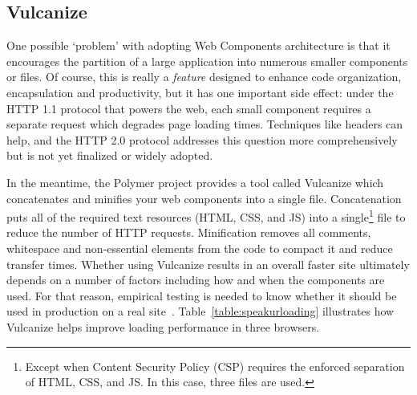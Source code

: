 \subsection{Vulcanize}
One possible `problem' with adopting Web Components architecture is that it encourages the partition of a large application into numerous smaller components or files.
Of course, this is really a \textit{feature} designed to enhance code organization, encapsulation and productivity, 
but it has one important side effect: 
under the HTTP 1.1 protocol that powers the web, each small component requires a separate request which degrades page loading times.
Techniques like  headers can help, and the HTTP 2.0 protocol addresses this question more comprehensively but is not yet finalized or widely adopted.

In the meantime, the Polymer project provides a tool called Vulcanize which concatenates and minifies your web components into a single file.
Concatenation puts all of the required text resources (HTML, CSS, and JS) into a 
single\footnote{Except when Content Security Policy (CSP) requires the enforced separation of HTML, CSS, and JS. In this case, three files are used.}
file to reduce the number of HTTP requests.
Minification removes all comments, whitespace and non-essential elements from the code to compact it and reduce transfer times.
Whether using Vulcanize results in an overall faster site ultimately depends on a number of factors including how and when the components are used.
For that reason, empirical testing is needed to know whether it should be used in production on a real site~\cite{polymercontributors2015-a}.
Table~\ref{table:speakurloading} illustrates how Vulcanize helps improve loading performance in three browsers.